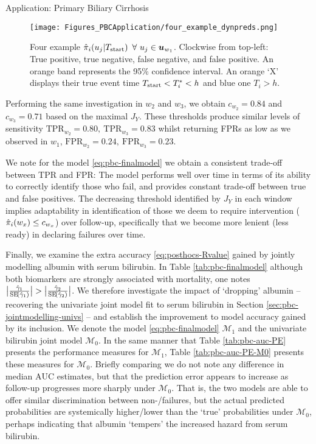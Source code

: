 \begin{chapter}{\label{cha:app-PBC}Application: Primary Biliary Cirrhosis}
  \begin{figure}[ht]
      \centering
      \texttt{[image: Figures\_PBCApplication/four\_example\_dynpreds.png]}
      \caption{Four example $\hat{\pi}_i\!\left( u_j|T_{\mathrm{start}}\right)\ \forall\ u_j\in \bm{u}_{w{_1}}$. Clockwise from top-left: True positive, true negative, false negative, and false positive. An orange band represents the 95\% confidence interval. An orange `X' displays their true event time $T_{\mathrm{start}}<T_i^*<h$ and blue one  $T_i>h$.}
      \label{fig:pbc-final-model-4examples}
  \end{figure}
  Performing the same investigation in $w_2$ and $w_3$, we obtain $c_{w{_2}}=0.84$ and $c_{w{_3}}=0.71$ based on the maximal $J_Y$. These thresholds produce similar levels of sensitivity $\mathrm{TPR}_{w{_2}}=0.80,\ \mathrm{TPR}_{w{_3}}=0.83$ whilst returning FPRs as low as we observed in $w_1$, $\mathrm{FPR}_{w{_2}}=0.24,\ \mathrm{FPR}_{w{_3}}=0.23$.

  We note for the model \eqref{eq:pbc-finalmodel} we obtain a consistent trade-off between TPR and FPR: The model performs well over time in terms of its ability to correctly identify those who fail, and provides constant trade-off between true and false positives. The decreasing threshold identified by $J_Y$ in each window implies adaptability in identification of those we deem to require intervention (\eg $\hat{\pi}_i\!\left( w_x\right)\le c_{w{_x}}$) over follow-up, specifically that we become more lenient (\ie less ready) in declaring failures over time.
  
  Finally, we examine the extra accuracy \eqref{eq:posthocs-Rvalue} gained by jointly modelling albumin with serum bilirubin. In Table \ref{tab:pbc-finalmodel} although both biomarkers are strongly associated with mortality, one notes $\big|\frac{\hat{\gamma}_1}{\mathrm{SE}\lb\hat{\gamma}_1\rb}\big|>\big|\frac{\hat{\gamma}_2}{\mathrm{SE}\lb\hat{\gamma}_2\rb}\big|$. We therefore investigate the impact of `dropping' albumin -- \ie recovering the univariate joint model fit to serum bilirubin in Section \ref{sec:pbc-jointmodelling-univs} -- and establish the improvement to model accuracy gained by its inclusion. We denote the model \eqref{eq:pbc-finalmodel} $\mathcal{M}_1$ and the univariate bilirubin joint model $\mathcal{M}_0$. In the same manner that Table \ref{tab:pbc-auc-PE} presents the performance measures for $\mathcal{M}_1$, Table \ref{tab:pbc-auc-PE-M0} presents these measures for $\mathcal{M}_0$. Briefly comparing we do not note any difference in median $\mathrm{AUC}$ estimates, but that the prediction error appears to increase as follow-up progresses more sharply under $\mathcal{M}_0$. That is, the two models are able to offer similar discrimination between non-/failures, but the actual predicted probabilities are systemically higher/lower than the `true' probabilities under $\mathcal{M}_0$, perhaps indicating that albumin `tempers' the increased hazard from serum bilirubin.
  

\end{chapter}
